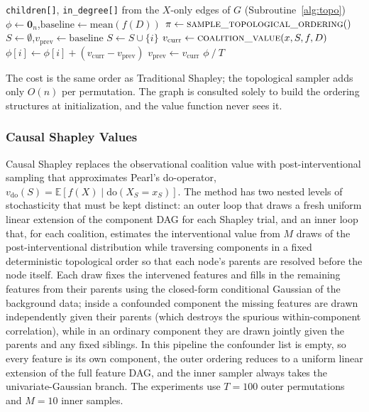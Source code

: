 \documentclass[12pt,a4paper,oneside]{article}
\begin{document}
\begin{algorithm}[H]
  \caption{Asymmetric Shapley}
  \label{alg:asymmetric}
  \begin{algorithmic}[1]
    \PRECOMPUTE \texttt{children[]}, \texttt{in\_degree[]} from the $X$-only edges of $G$  (Subroutine~\ref{alg:topo})
    \State $\phi \gets \mathbf{0}_n$,\quad $\text{baseline} \gets \text{mean}(f(D))$
      \State $\pi \gets \textsc{sample\_topological\_ordering}()$  
      \State $S \gets \emptyset$,\quad $v_{\text{prev}} \gets \text{baseline}$
        \State $S \gets S \cup \{i\}$
        \State $v_{\text{curr}} \gets \textsc{coalition\_value}(x, S, f, D)$  
        \State $\phi[i] \gets \phi[i] + (v_{\text{curr}} - v_{\text{prev}})$
        \State $v_{\text{prev}} \gets v_{\text{curr}}$
      \EndFor
    \EndFor
    \Return $\phi \mathbin{/} T$
  \end{algorithmic}
\end{algorithm}

The cost is the same order as Traditional Shapley; the topological sampler adds only $O(n)$ per permutation. The graph is consulted solely to build the ordering structures at initialization, and the value function never sees it.

\subsubsection{Causal Shapley Values}

Causal Shapley replaces the observational coalition value with post-interventional sampling that approximates Pearl's do-operator, $v_{\mathrm{do}}(S) = \mathbb{E}[f(X) \mid \mathrm{do}(X_S = x_S)]$. The method has two nested levels of stochasticity that must be kept distinct: an outer loop that draws a fresh uniform linear extension of the component DAG for each Shapley trial, and an inner loop that, for each coalition, estimates the interventional value from $M$ draws of the post-interventional distribution while traversing components in a fixed deterministic topological order so that each node's parents are resolved before the node itself. Each draw fixes the intervened features and fills in the remaining features from their parents using the closed-form conditional Gaussian of the background data; inside a confounded component the missing features are drawn independently given their parents (which destroys the spurious within-component correlation), while in an ordinary component they are drawn jointly given the parents and any fixed siblings. In this pipeline the confounder list is empty, so every feature is its own component, the outer ordering reduces to a uniform linear extension of the full feature DAG, and the inner sampler always takes the univariate-Gaussian branch. The experiments use $T = 100$ outer permutations and $M = 10$ inner samples.
\end{document}
